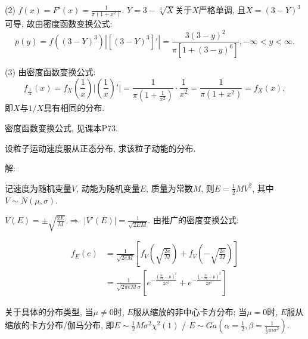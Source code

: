 \documentclass[standard]{ExBook}
\begin{document}
\begin{qitems}
\begin{bbox}
(2) $f(x)=F'(x)=\displaystyle\frac{1}{\pi(1+x^2)}$. $Y=3-\sqrt[3]{X}$关于$X$严格单调, 且$X=(3-Y)^{3}$可导, 故由密度函数变换公式:
$$p(y)=f((3-Y)^{3})|[(3-Y)^{3}]'|=\frac{3(3-y)^2}{\pi[1+(3-y)^6]},-\infty < y < \infty.$$
    \end{bbox}

\vspace{-5em}

    \begin{bbox}
(3) 由密度函数变换公式:
$$f_{\frac{1}{X}}(x)=f_{X}(\frac{1}{x})\bigg|\left(\frac{1}{x}\right)'\bigg|=\frac{1}{\pi(1+\frac{1}{x^2})}\cdot\frac{1}{x^2}=\frac{1}{\pi(1+x^2)}=f_{X}(x),$$
即$X$与$1/X$具有相同的分布.

\textcolor{themeColor}{\selectfont {} 密度函数变换公式, 见课本P73.}
    \end{bbox}

\vspace{-5em}

    \begin{bbox}
    \begin{shaded}
        \qitem
设粒子运动速度服从正态分布, 求该粒子动能的分布.
    \end{shaded}
    \end{bbox}

\vspace{-5em}

    \begin{bbox}
解:

记速度为随机变量$V$, 动能为随机变量$E$, 质量为常数$M$, 则$E=\frac{1}{2}M V^2$, 其中$V\sim N(\mu,\sigma)$.

$V(E)=\pm\sqrt{\displaystyle\frac{2E}{M}}$ $\Longrightarrow$ $|V'(E)|=\displaystyle\frac{1}{\sqrt{2EM}}$. 由推广的密度变换公式:
\vspace{-2em}
\begin{center}
\begin{equation}
\begin{aligned}
    \nonumber
f_{E}(e)&=\displaystyle\frac{1}{\sqrt{2eM}}\left[f_{V}\left(\sqrt{\frac{2e}{M}}\right)+f_{V}\left(-\sqrt{\frac{2e}{M}}\right)\right]\\
 &=\displaystyle\frac{1}{\sqrt{2\pi eM}\sigma}\left[e^{-\frac{(\frac{2e}{M}-\mu)^2}{2 \sigma^2}}+e^{-\frac{(-\frac{2e}{M}-\mu)^2}{2 \sigma^2}}\right]
\end{aligned}
\end{equation}
\end{center}
关于具体的分布类型, 当$\mu\neq0$时, $E$服从缩放的非中心卡方分布; 当$\mu=0$时, $E$服从缩放的卡方分布/伽马分布, 即$E\sim\frac{1}{2}M \sigma^2 \chi^{2}(1)$ / $E\sim Ga(\alpha=\frac{1}{2},\beta=\frac{1}{\frac{1}{2}m \sigma^2})$.


\end{bbox}
\end{qitems}
\end{document}
